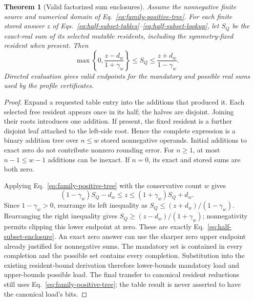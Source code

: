 \documentclass[11pt]{article}
\newtheorem{theorem}{Theorem}
\begin{document}
\begin{theorem}[Valid factorized sum enclosures]\label{thm:factorized-sum-enclosures}
Assume the nonnegative finite source and numerical domain of Eq.~\eqref{eq:family-positive-tree}. For each finite stored answer $z$ of Eqs.~\eqref{eq:half-subset-tables}--\eqref{eq:half-subset-lookup}, let $S_Q$ be the exact-real sum of its selected mutable residents, including the symmetry-fixed resident when present. Then
\begin{equation}
\max\!\left\{0,\frac{z-d_w}{1+\gamma_w}\right\}
\le S_Q\le\frac{z+d_w}{1-\gamma_w}.
\label{eq:half-subset-enclosure}
\end{equation}
Directed evaluation gives valid endpoints for the mandatory and possible real sums used by the profile certificates.
\end{theorem}
\begin{proof}
Expand a requested table entry into the additions that produced it. Each selected free resident appears once in its half; the halves are disjoint. Joining their roots introduces one addition. If present, the fixed resident is a further disjoint leaf attached to the left-side root. Hence the complete expression is a binary addition tree over $n\le w$ stored nonnegative operands. Initial additions to exact zero do not contribute nonzero rounding error. For $n\ge1$, at most $n-1\le w-1$ additions can be inexact. If $n=0$, its exact and stored sums are both zero.

Applying Eq.~\eqref{eq:family-positive-tree} with the conservative count $w$ gives
\begin{equation}
(1-\gamma_w)S_Q-d_w\le z\le(1+\gamma_w)S_Q+d_w.
\end{equation}
Since $1-\gamma_w>0$, rearrange its left inequality as $S_Q\le(z+d_w)/(1-\gamma_w)$. Rearranging the right inequality gives $S_Q\ge(z-d_w)/(1+\gamma_w)$; nonnegativity permits clipping this lower endpoint at zero. These are exactly Eq.~\eqref{eq:half-subset-enclosure}. An exact zero answer can use the sharper zero upper endpoint already justified for nonnegative sums. The mandatory set is contained in every completion and the possible set contains every completion. Substitution into the existing resident-bound derivation therefore lower-bounds mandatory load and upper-bounds possible load. The final transfer to canonical resident reductions still uses Eq.~\eqref{eq:family-positive-tree}; the table result is never asserted to have the canonical load's bits.
\end{proof}
\end{document}
